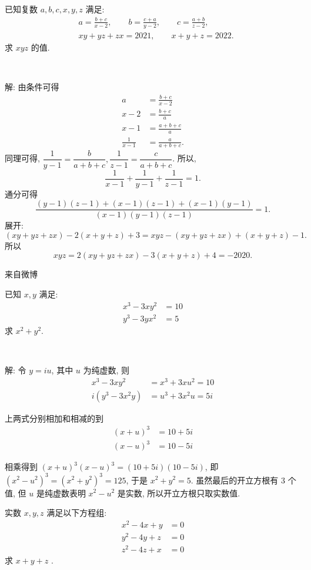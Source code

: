 已知复数 $a,b,c,x,y,z$ 满足:
\begin{align*}
& a = \frac{b+c}{x-2}, \qquad b = \frac{c+a}{y-2},\qquad c = \frac{a+b}{z-2},\\
& xy+yz+zx = 2021,\qquad x+y+z=2022.
\end{align*}
求 $xyz$ 的值.

~

解: 由条件可得
\begin{align*}
a &= \frac{b+c}{x-2}\\
x-2 &= \frac{b+c}{a}\\
x-1 &= \frac{a+b+c}{a}\\
\frac{1}{x-1} &= \frac{a}{a+b+c}.
\end{align*}
同理可得, $\dfrac{1}{y-1} = \dfrac{b}{a+b+c}, \dfrac{1}{z-1} = \dfrac{c}{a+b+c}$.
所以, 
\[\frac{1}{x-1} + \frac{1}{y-1}+\frac{1}{z-1} = 1.\]
通分可得
\[\frac{(y-1)(z-1)+(x-1)(z-1)+(x-1)(y-1)}{(x-1)(y-1)(z-1)} = 1.\]
展开:
\[ (xy + yz + zx) - 2(x+y+z) + 3 = xyz - (xy+yz+zx) + (x+y+z) - 1.\]
所以
\[xyz = 2(xy+yz+zx) - 3(x+y+z) + 4 = -2020.\]

\newpage
\noindent 来自微博

已知 $x,y$ 满足:
\begin{align*}
x^3-3xy^2&=10\\
y^3-3yx^2&=5
\end{align*}
求 $x^2+y^2$.

~

解: 令 $y = iu$, 其中 $u$ 为纯虚数, 则 
\begin{align*} 
x^3-3xy^2 &= x^3+3xu^2=10\\
i(y^3-3x^2y) &= u^3+3x^2u=5i
\end{align*}

上两式分别相加和相减的到
\begin{align*}
(x+u)^3 & =10+5i\\
(x-u)^3 &= 10-5i
\end{align*}

相乘得到 $(x+u)^3(x-u)^3=(10+5i)(10-5i)$, 即 $(x^2-u^2)^3=(x^2+y^2)^3=125$, 于是 $x^2+y^2=5$. 虽然最后的开立方根有 3 个值, 但 $u$ 是纯虚数表明 $x^2-u^2$ 是实数, 所以开立方根只取实数值.


\newpage
实数 $x,y,z$ 满足以下方程组:
\begin{align*}
x^2 - 4x + y &= 0 \\
y^2 - 4y + z &= 0\\
z^2 - 4z + x &= 0
\end{align*}
求 $x+y+z$ .

